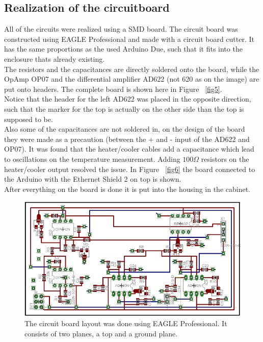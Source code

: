 \documentclass[12pt]{scrartcl}
\begin{document}
    \subsection{Realization of the circuitboard}
      All of the circuits were realized using a SMD board. The circuit board was
      constructed using EAGLE Professional and made with a circuit board cutter.
      It has the same proportions as the used Arduino Due, such that it fits
      into the enclosure thats already existing.
      \\The resistors and the capacitances are directly soldered onto the board,
      while the OpAmp OP07 and the differential amplifier AD622
      (not 620 as on the image) are put onto
      headers. The complete board is shown here in Figure~ \ref{fig5}.
      \\ Notice that the header for the left AD622 was placed in the opposite
      direction, such that the marker for the top is actually on the other side
      than the top is supposed to be.\\
      Also some of the capacitances are not soldered in, on the design of the
      board they were made as a precaution (between the + and - input of the AD622 and OP07).
      It was found that the heater/cooler cables add a capacitance which lead
      to oscillations on the temperature measurement. Adding $100 \Omega$
      resistors on the heater/cooler output resolved the issue. In Figure~
      \ref{fig6} the board connected to the Arduino with the Ethernet
      Shield 2 on top is shown. \\
      After everything on the board is done it is put into the housing in the
      cabinet.
      \begin{figure}[H]
        \includegraphics[width = \textwidth]{board.png}
        \caption{The circuit board layout was done using EAGLE Professional.
        It consists of two planes, a top and a ground plane.}
        \label{fig4}
      \end{figure}
\end{document}
